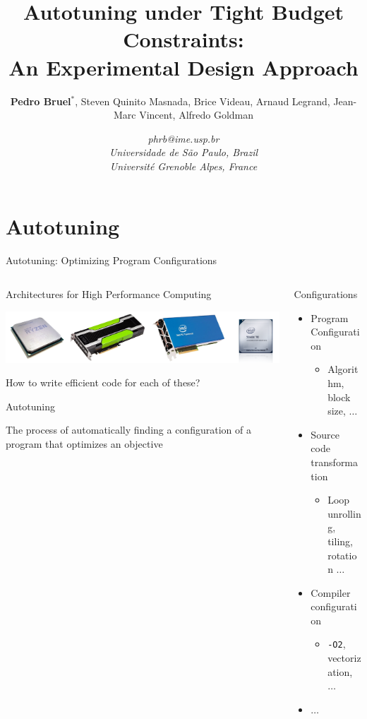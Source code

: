 \documentclass[10pt, compress, aspectratio=169, xcolor={table,usenames,dvipsnames}]{beamer}
\author{ \footnotesize \textbf{\alert{Pedro Bruel$^{*}$}},  Steven Quinito Masnada, Brice Videau, Arnaud Legrand, Jean-Marc Vincent, Alfredo Goldman}
\date{ \scriptsize \textit{phrb@ime.usp.br} \\[1em] \textit{Universidade de São Paulo, Brazil} \\ \textit{Université Grenoble Alpes, France}}
\title{Autotuning under Tight Budget Constraints:  \\ An Experimental Design Approach}
\begin{document}
\maketitle

\section{Autotuning}
\label{sec:org3b078b5}
\begin{frame}[label={sec:orgaa600d4},fragile]{Autotuning: Optimizing Program Configurations}
 \begin{columns}
\begin{column}{0.5\columnwidth}
\begin{block}{Architectures for High Performance Computing}
\begin{center}
\includegraphics[width=.9\linewidth]{../../../img/architectures.png}
\end{center}

How to write \alert{efficient code} for each of these?

\begin{block}{Autotuning}
\vspace{.2cm}

The process of automatically finding a \alert{configuration} of a program that
optimizes an \alert{objective}
\end{block}
\end{block}
\end{column}

\begin{column}{0.5\columnwidth}
\begin{block}{Configurations}
\begin{itemize}
\item Program Configuration
\begin{itemize}
\item Algorithm, block size, \(\dots\)
\end{itemize}
\item Source code transformation
\begin{itemize}
\item Loop unrolling, tiling, rotation \(\dots\)
\end{itemize}
\item Compiler configuration
\begin{itemize}
\item \texttt{-O2}, vectorization, \(\dots\)
\end{itemize}
\item \(\dots\)


\end{itemize}
\end{block}
\end{column}
\end{columns}
\end{frame}
\end{document}
